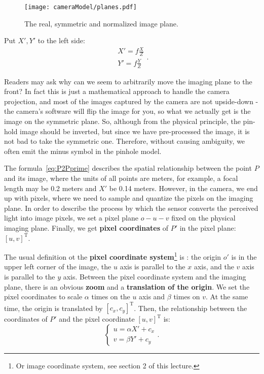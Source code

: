 \begin{figure}[!htp]
	\centering
	\texttt{[image: cameraModel/planes.pdf]}
	\caption{The real, symmetric and normalized image plane.}
	\label{fig:planes}
\end{figure}

Put $X', Y'$ to the left side:
\begin{equation}\label{eq:P2Pprime}
\begin{array}{l}
X' = f\frac{X}{Z}\\
Y' = f\frac{Y}{Z}
\end{array}.
\end{equation}

Readers may ask why can we seem to arbitrarily move the imaging plane to the front? In fact this is just a mathematical approach to handle the camera projection, and most of the images captured by the camera are not upside-down - the camera's software will flip the image for you, so what we actually get is the image on the symmetric plane. So, although from the physical principle, the pin-hold image should be inverted, but since we have pre-processed the image, it is not bad to take the symmetric one. Therefore, without causing ambiguity, we often emit the minus symbol in the pinhole model.

The formula~\eqref{eq:P2Pprime} describes the spatial relationship between the point $P$ and its image, where the units of all points are meters,  for example, a focal length may be 0.2 meters and $X'$ be 0.14 meters. However, in the camera, we end up with pixels, where we need to sample and quantize the pixels on the imaging plane. In order to describe the process by which the sensor converts the perceived light into image pixels, we set a pixel plane $o-u-v$ fixed on the physical imaging plane. Finally, we get \textbf{pixel coordinates} of $P'$ in the pixel plane: $[u,v]^\mathrm{T}$.

The usual definition ot the \textbf{pixel coordinate system}\footnote{ Or image coordinate system, see section 2 of this lecture. } is : the origin $o'$ is in the upper left corner of the image, the $u$ axis is parallel to the $x$ axis, and the $v$ axis is parallel to the $y$ axis. Between the pixel coordinate system and the imaging plane, there is an obvious \textbf{zoom} and a \textbf{translation of the origin}. We set the pixel coordinates to scale $\alpha$ times on the $u$ axis and $\beta$ times on $v$. At the same time, the origin is translated by $[c_x, c_y]^\mathrm{T}$. Then, the relationship between the coordinates of $P'$ and the pixel coordinate $[u,v]^\mathrm{T}$ is:
\begin{equation}
\label{eq:project2pixel1} 
\left\{
\begin{matrix} 
u=\alpha X' + c_x\\ 
v=\beta Y' + c_y
\end{matrix}
\right. .
\end{equation}

